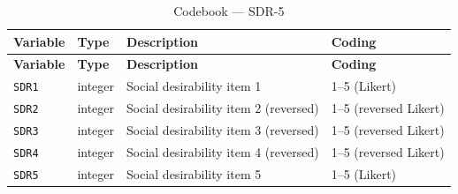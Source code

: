 \documentclass[11pt,a4paper]{article}
\begin{document}
{\small
\begin{longtable}{p{3cm} p{1.5cm} p{5.5cm} p{4cm}}
\caption{Codebook --- SDR-5}\\
\toprule
\textbf{Variable} & \textbf{Type} & \textbf{Description} & \textbf{Coding}\\
\midrule
\endfirsthead
\toprule
\textbf{Variable} & \textbf{Type} & \textbf{Description} & \textbf{Coding}\\
\midrule
\endhead
\bottomrule
\endfoot

\texttt{SDR1} & integer & Social desirability item 1 & 1--5 (Likert) \\
\texttt{SDR2} & integer & Social desirability item 2 (reversed) & 1--5 (reversed Likert) \\
\texttt{SDR3} & integer & Social desirability item 3 (reversed) & 1--5 (reversed Likert) \\
\texttt{SDR4} & integer & Social desirability item 4 (reversed) & 1--5 (reversed Likert) \\
\texttt{SDR5} & integer & Social desirability item 5 & 1--5 (Likert) \\
\end{longtable}
}
\end{document}
